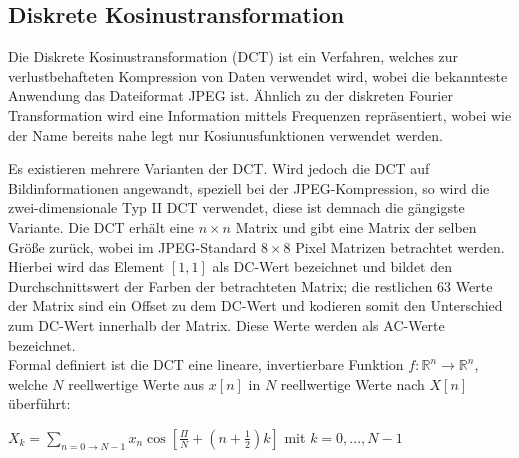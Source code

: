 \subsection{Diskrete Kosinustransformation}
\label{sec:dct}

Die Diskrete Kosinustransformation (DCT)\cite{Khayam03thediscrete} ist ein Verfahren, welches zur verlustbehafteten Kompression von Daten verwendet wird, wobei die bekannteste Anwendung das Dateiformat JPEG ist.
Ähnlich zu der diskreten Fourier Transformation wird eine Information mittels Frequenzen repräsentiert, wobei wie der Name bereits nahe legt nur Kosiunusfunktionen verwendet werden.


Es existieren mehrere Varianten der DCT.
Wird jedoch die DCT auf Bildinformationen angewandt, speziell bei der JPEG-Kompression, so wird die zwei-dimensionale Typ II DCT verwendet, diese ist demnach die gängigste Variante.
Die DCT erhält eine $n \times  n$ Matrix und gibt eine Matrix der selben Größe zurück, wobei im JPEG-Standard $8 \times 8$ Pixel Matrizen betrachtet werden.
Hierbei wird das Element $[1,1]$ als DC-Wert bezeichnet und bildet den Durchschnittswert der Farben der betrachteten Matrix; die restlichen 63 Werte der Matrix sind ein Offset zu dem DC-Wert und kodieren somit den Unterschied zum DC-Wert innerhalb der Matrix.
Diese Werte werden als AC-Werte bezeichnet.\\
Formal definiert ist die DCT eine lineare, invertierbare Funktion $f : \mathbb{R}^n \rightarrow \mathbb{R}^n$, welche $N$ reellwertige Werte aus $x[n]$ in $N$ reellwertige Werte nach $X[n]$ überführt:\\

\begin{centering}
$X_k = \sum\limits_{n=0\rightarrow N-1} x_n \cos [\frac{\Pi}{N} + (n + \frac{1}{2}) k ]$ mit $k = 0,..., N-1$\\
\end{centering}

